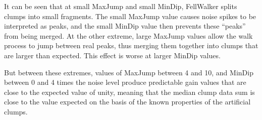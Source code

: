 \documentclass[final,authoryear,5p,times,twocolumn]{elsarticle}
\begin{document}
It can be seen that at small MaxJump and small MinDip, FellWalker splits
clumps into small fragments. The small MaxJump value causes noise spikes
to be interpreted as peaks, and the small MinDip value then prevents these
``peaks'' from being merged. At the other extreme, large MaxJump values
allow the walk process to jump between real peaks, thus merging them
together into clumps that are larger than expected. This effect is worse
at larger MinDip values.

But between these extremes, values of MaxJump between 4 and 10, and MinDip
between 0 and 4 times the noise level produce predictable gain values that
are close to the expected value of unity, meaning that the median clump data
sum is close to the value expected on the basis of the known properties
of the artificial clumps.
\end{document}
